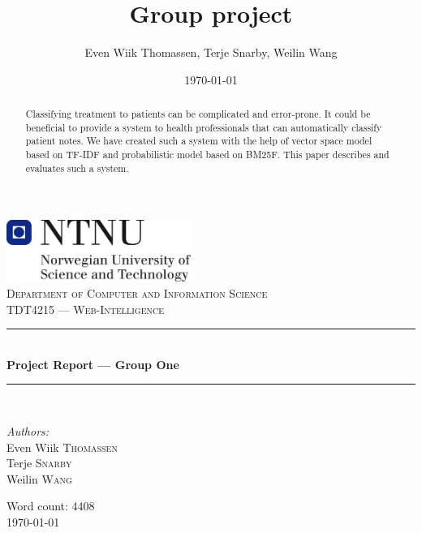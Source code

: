 \documentclass[11pt,a4paper]{report}
\title{Group project}
\author{Even Wiik Thomassen, Terje Snarby, Weilin Wang}
\date{\today}
\begin{document}
\begin{titlepage}
\begin{center}
\includegraphics[width=0.45\textwidth]{./img/NTNU-logo.png}\\[5cm]
\textsc{\large Department of Computer and Information Science}\\[0.2cm]
\textsc{\Large TDT4215 --- Web-Intelligence}\\[0.5cm]

\rule{\linewidth}{0.2mm} \\[0.4cm]
{ \LARGE \bfseries Project Report --- Group One}\\[0.2cm]
\rule{\linewidth}{0.2mm} \\[1.5cm]

\begin{minipage}{0.4\textwidth}
\begin{flushleft} \large
\emph{Authors:}\\
Even Wiik \textsc{Thomassen}\\
Terje \textsc{Snarby}\\
Weilin \textsc{Wang}
\end{flushleft}
\end{minipage}

\vfill
{\large Word count: 4408}\\[0.2cm]
{\large \today}
\end{center}
\end{titlepage}


\begin{abstract}
Classifying treatment to patients can be complicated and error-prone. It could be beneficial to provide a system to health professionals that can automatically classify patient notes. We have created such a system with the help of vector space model based on TF-IDF and probabilistic model based on BM25F. This paper describes and evaluates such a system.
\end{abstract}


\clearpage
{}
{}
\tableofcontents
\end{document}
